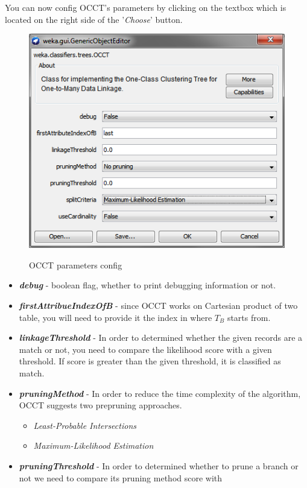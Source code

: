 \documentclass[a4paper,12pt]{article}
\begin{document}
\begin{spacing}{1.5}
You can now config OCCT's parameters by clicking on the textbox which is located on the right side of the '{\em Choose}' button.
\clearpage
\begin{figure}[!h]
  \centering
  \includegraphics{Figures/GUI/OCCTConfig}\\
  \caption{OCCT parameters config}
  \label{fig:occtconf}
\end{figure}
\begin{itemize}
  \item \textbf{{\em debug}} - boolean flag, whether to print debugging information or not.
  \item \textbf{{\em firstAttribueIndexOfB}} - since OCCT works on Cartesian product of two table, you will need to provide it the
  index in where $T_{B}$ starts from.
  \item \textbf{{\em linkageThreshold}} - In order to determined whether the given records are a match or not, you need to compare the likelihood
  score with a given threshold. If score is greater than the given threshold, it is classified as match.
  \item \textbf{{\em pruningMethod}} - In order to reduce the time complexity of the algorithm, OCCT suggests two prepruning approaches.
  \begin{itemize}
    \item {\em Least-Probable Intersections}
    \item {\em Maximum-Likelihood Estimation}
  \end{itemize}
  \item \textbf{{\em pruningThreshold}} - In order to determined whether to prune a branch or not we need to compare its pruning method score with

\end{itemize}
\end{spacing}
\end{document}
